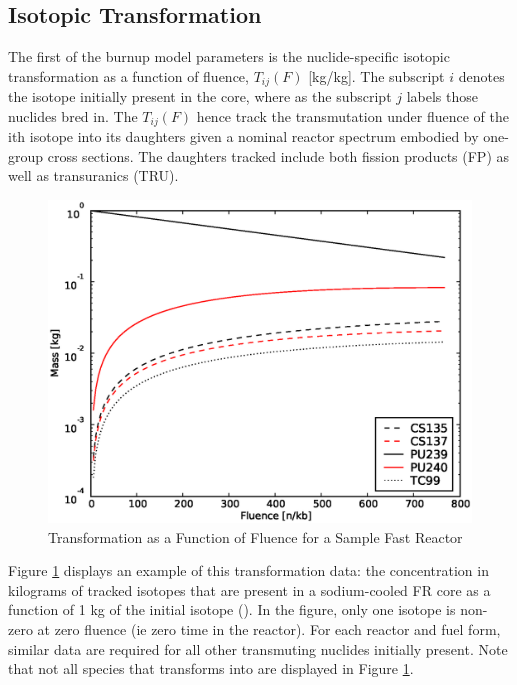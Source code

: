\subsection{Isotopic Transformation}
\label{1g_sec:iso_transform}
The first of the burnup model parameters is the nuclide-specific isotopic transformation as a 
function of fluence, $T_{ij}(F)$ [kg/kg].  The subscript $i$ denotes 
the isotope initially present in the core, where as the subscript $j$ labels those nuclides bred in.  
The $T_{ij}(F)$ hence track the transmutation under fluence of the ith isotope into its daughters 
given a nominal reactor spectrum embodied by one-group cross sections.  The daughters tracked 
include both fission products (FP) as well as transuranics (TRU).
\begin{figure}[htbp]
\caption{ Transformation as a Function of Fluence for a Sample Fast Reactor}
\label{1g_fig01}
\begin{center}
\includegraphics[scale=0.5]{one_group_method/figs/Fig01.eps}
\end{center}
\end{figure}
Figure \ref{1g_fig01} displays an example of this transformation data: the concentration in 
kilograms of tracked isotopes that are present in a sodium-cooled FR core as a function of 1 kg 
of the initial isotope ().  In the figure, only one isotope 
is non-zero at zero fluence (ie zero time in the reactor).  For each 
reactor and fuel form, similar data are required for all other transmuting 
nuclides initially present.   Note that not all species that  transforms into are displayed
in Figure \ref{1g_fig01}. 

